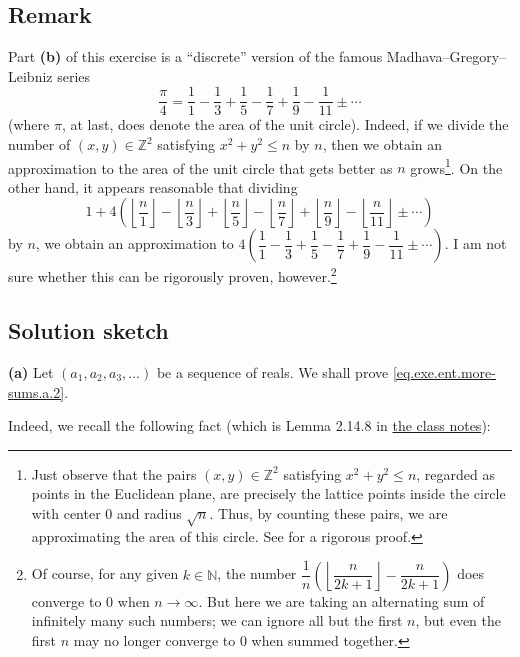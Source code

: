 \documentclass[paper=a4, fontsize=12pt]{scrartcl}%
\theoremstyle{plainsl}
\theoremstyle{definition}
\theoremstyle{remark}
\begin{document}
\subsection{Remark}

Part \textbf{(b)} of this exercise is a ``discrete'' version of the famous
Madhava--Gregory--Leibniz series
\[
\dfrac{\pi}{4} = \dfrac{1}{1} - \dfrac{1}{3} + \dfrac{1}{5} - \dfrac{1}{7} +
\dfrac{1}{9} - \dfrac{1}{11} \pm\cdots
\]
(where $\pi$, at last, does denote the area of the unit circle). Indeed, if we
divide the number of $\left(  x, y \right)  \in\mathbb{Z}^{2}$ satisfying
$x^{2} + y^{2} \leq n$ by $n$, then we obtain an approximation to the area of
the unit circle that gets better as $n$ grows\footnote{Just observe that the
pairs $\left(  x, y \right)  \in\mathbb{Z}^{2}$ satisfying $x^{2} + y^{2} \leq
n$, regarded as points in the Euclidean plane, are precisely the lattice
points inside the circle with center $0$ and radius $\sqrt{n}$. Thus, by
counting these pairs, we are approximating the area of this circle. See
\cite[Theorem 12.1]{Clark18} for a rigorous proof.}. On the other hand, it
appears reasonable that dividing
\[
1 + 4 \left(  \left\lfloor \dfrac{n}{1} \right\rfloor - \left\lfloor \dfrac
{n}{3} \right\rfloor + \left\lfloor \dfrac{n}{5} \right\rfloor - \left\lfloor
\dfrac{n}{7} \right\rfloor + \left\lfloor \dfrac{n}{9} \right\rfloor -
\left\lfloor \dfrac{n}{11} \right\rfloor \pm\cdots\right)
\]
by $n$, we obtain an approximation to $4 \left(  \dfrac{1}{1} - \dfrac{1}{3} +
\dfrac{1}{5} - \dfrac{1}{7} + \dfrac{1}{9} - \dfrac{1}{11} \pm\cdots\right)
$. I am not sure whether this can be rigorously proven, however.\footnote{Of
course, for any given $k \in\mathbb{N}$, the number $\dfrac{1}{n}\left(
\left\lfloor \dfrac{n}{2k+1} \right\rfloor - \dfrac{n}{2k+1} \right)  $ does
converge to $0$ when $n \to\infty$. But here we are taking an alternating sum
of infinitely many such numbers; we can ignore all but the first $n$, but even
the first $n$ may no longer converge to $0$ when summed together.}

\subsection{Solution sketch}

\textbf{(a)} Let $\left(  a_{1},a_{2},a_{3},\ldots\right)  $ be a sequence of
reals. We shall prove \eqref{eq.exe.ent.more-sums.a.2}.

Indeed, we recall the following fact (which is Lemma 2.14.8 in
\href{http://www.cip.ifi.lmu.de/~grinberg/t/19s/notes.pdf}{the class notes}):
\end{document}

